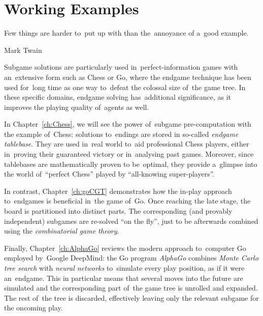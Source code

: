 \section{Working Examples}
\epigraph{
  Few things are harder to~put up with than the~annoyance of a~good example.
}{Mark Twain}
Subgame solutions are particularly used in~perfect-information games with an~extensive form such as Chess or Go, where the endgame technique has been used for~long time as one way to~defeat the colossal size of~the game tree.
In these specific domains, endgame solving has~additional significance, as it improves the playing quality of~agents as well.

In Chapter~\ref{ch:Chess}, we will see the power of~subgame pre-computation with the example of~Chess:
solutions to~endings are stored in so-called \emph{endgame tablebase}.
They are used in~real world to~aid professional Chess players, either in~proving their guaranteed victory or in~analysing past games.
Moreover, since tablebases are mathematically proven to be~optimal, they provide a~glimpse into the world of~``perfect Chess'' played by ``all-knowing super-players''.

In contrast, Chapter~\ref{ch:goCGT} demonstrates how the in-play approach to~endgames is beneficial in~the game of~Go.
Once reaching the late stage, the board is partitioned into distinct parts.
The corresponding (and provably independent) subgames are re-solved ``on the fly'', just to be afterwards combined using the \emph{combinatorial game theory}.

Finally, Chapter~\ref{ch:AlphaGo} reviews the modern approach to~computer Go employed by~Google DeepMind:
the Go program \emph{AlphaGo} combines \emph{Monte Carlo tree search} with \emph{neural networks} to~simulate every play position, as if it were an~endgame.
This in particular means that several moves into the future are simulated and the corresponding part of~the game tree is unrolled and expanded.
The rest of~the tree is discarded, effectively leaving only the relevant subgame for the oncoming play.
